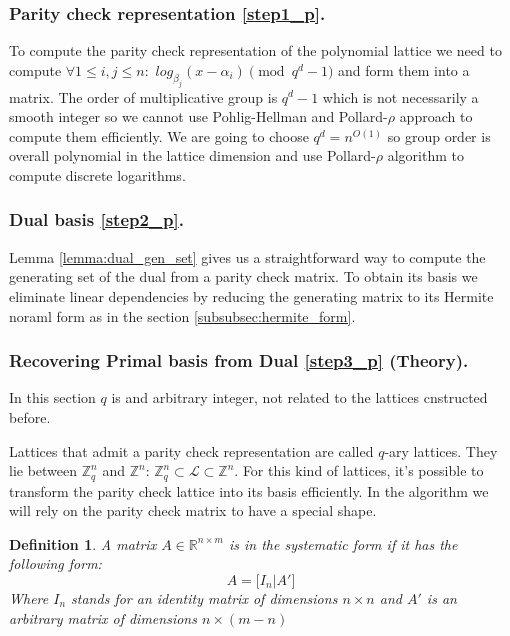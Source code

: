 \documentclass[12pt]{article}
\newcommand{\ZZ}{\mathbb{Z}}
\newcommand{\LL}{\mathcal{L}}
\newtheorem{definition}{Definition}
\begin{document}
\subsubsection{Parity check representation \ref{step1_p}.}
\label{subsubsec:parity_check_polynomials}
To compute the parity check representation of the polynomial lattice we need to compute
$\forall 1 \leq i,j \leq n :$ $log_{\beta_j}(x - \alpha_i) \pmod{q^{d} -1}$ and form them into a matrix. The order of multiplicative group is $q^{d} - 1$ which is not necessarily a smooth integer so we cannot use Pohlig-Hellman \cite{[PH78]} and Pollard-$\rho$ \cite{[Pol78]} approach to compute them efficiently. We are going to choose $q^{d} = n^{O(1)}$ so group order is overall polynomial in the lattice dimension and use Pollard-$\rho$ \cite{[Pol78]} algorithm to compute discrete logarithms.

\subsubsection{Dual basis \ref{step2_p}.}
\label{subsubsec:dual_gen_set_polynomials}

Lemma \ref{lemma:dual_gen_set} gives us a straightforward way to compute the generating set of the dual from a parity check matrix. To obtain its basis we eliminate linear dependencies by reducing the generating matrix to its Hermite noraml form as in the section \ref{subsubsec:hermite_form}.

\subsubsection{Recovering Primal basis from Dual \ref{step3_p} (Theory).}
\label{subsubsec:primal_from_dual_t_polynomials}

In this section $q$ is and arbitrary integer, not related to the lattices cnstructed before.

Lattices that admit a parity check representation are called $q$-ary lattices. They lie between $\ZZ^{n}_{q}$ and $\ZZ^{n}$: $\ZZ^{n}_{q}  \subset \LL \subset \ZZ^{n}$. For this kind of lattices, it's possible to transform the parity check lattice into its basis efficiently. In the algorithm we will rely on the parity check matrix to have a special shape.
\begin{definition}
A matrix $A \in \mathbb{R}^{n \times m}$ is in the systematic form if it has the following form:
\[
A = \big[ I_{n} | A' \big]
\]
Where $I_{n}$ stands for an identity matrix of dimensions $n \times n$ and $A'$ is an arbitrary matrix of dimensions $n \times (m-n)$
\end{definition}
\end{document}
